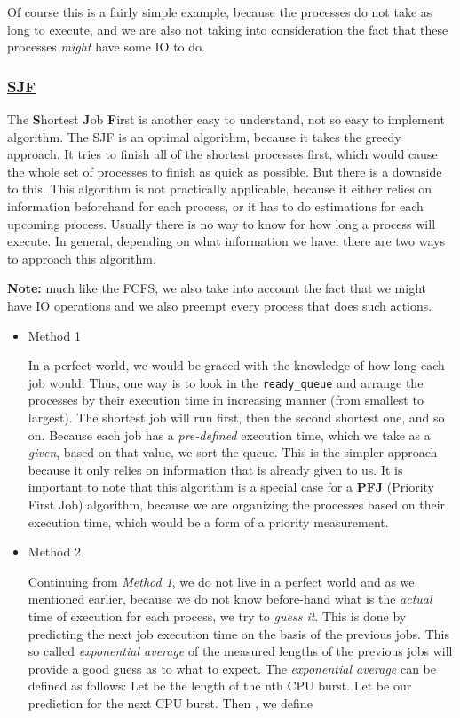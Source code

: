 \documentclass{article}
\newcommand{\code}[1]{\colorbox{codebg}{{\color{black}\texttt{#1}}}}
\begin{document}
Of course this is a fairly simple example, because the processes do not take as long to execute, and we are also not taking into consideration the fact that these processes \textit{might} have some IO to do.

\subsubsection{\underline{SJF}}

The \textbf{S}hortest \textbf{J}ob \textbf{F}irst is another easy to understand, not so easy to implement algorithm. The SJF is an optimal algorithm, because it takes the greedy approach. It tries to finish all of the shortest processes first, which would cause the whole set of processes to finish as quick as possible. But there is a downside to this. This algorithm is not practically applicable, because it either relies on information beforehand for each process, or it has to do estimations for each upcoming process. Usually there is no way to know for how long a process will execute. In general, depending on what information we have, there are two ways to approach this algorithm.

\textbf{Note:} much like the FCFS, we also take into account the fact that we might have IO operations and we also preempt every process that does such actions.


\begin{itemize}
\item Method 1

In a perfect world, we would be graced with the knowledge of how long each job would. Thus, one way is to look in the \code{ready\_queue} and arrange the processes by their execution time in increasing manner (from smallest to largest). The shortest job will run first, then the second shortest one, and so on. Because each job has a \textit{pre-defined} execution time, which we take as a \textit{given}, based on that value, we sort the queue. This is the simpler approach because it only relies on information that is already given to us. It is important to note that this algorithm is a special case for a \textbf{PFJ} (Priority First Job) algorithm, because we are organizing the processes based on their execution time, which would be a form of a priority measurement.

\item Method 2

Continuing from \textit{Method 1}, we do not live in a perfect world and as we mentioned earlier, because we do not know before-hand what is the \textit{actual} time of execution for each process, we try to \textit{guess it}. This is done by predicting the next job execution time on the basis of the previous jobs. This so called \textit{exponential average} of the measured lengths of the previous jobs will provide a good guess as to what to expect. The \textit{exponential average} can be defined as follows: Let  be the length of the nth CPU burst. Let  be our prediction for the next CPU burst. Then , we define
\end{itemize}
\end{document}
